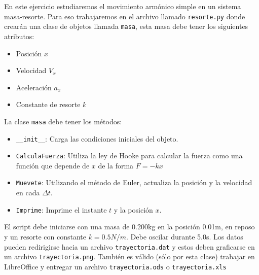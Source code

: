 \documentclass[11pt,letterpaper]{exam}
\begin{document}
\begin{questions}

 En este ejercicio estudiaremos el movimiento 
armónico simple en un sistema masa-resorte. Para eso trabajaremos en el archivo 
llamado \verb"resorte.py" donde crearán una clase de objetos llamada \verb"masa",
esta masa debe tener los siguientes atributos:
\begin{itemize}
	\item Posición $x$
	\item Velocidad $V_x$
	\item Aceleración $a_x$
	\item Constante de resorte $k$
\end{itemize}

La clase \verb"masa" debe tener los métodos:

\begin{itemize}
	\item  \verb"__init__": Carga las condiciones iniciales del objeto.
	\item  \verb"CalculaFuerza": Utiliza la ley de Hooke para calcular la fuerza
	como una función que depende de $x$ de la forma $ F = -kx$
	\item  \verb"Muevete": Utilizando el método de Euler, actualiza la posición y la velocidad en cada $\Delta t$.
	\item  \verb"Imprime": Imprime el instante $t$ y la posición $x$.
\end{itemize}



El script debe iniciarse con una masa de 0.200kg en la posición 0.01m, en reposo y 
un resorte con constante $k=0.5N/m$. Debe oscilar durante 5.0s. Los datos pueden redirigirse
hacia un archivo \verb"trayectoria.dat" y estos deben graficarse en un archivo \verb"trayectoria.png". También es válido (sólo por esta clase) trabajar en LibreOffice y
entregar un archivo \verb"trayectoria.ods" o \verb"trayectoria.xls"



\end{questions}
\end{document}
